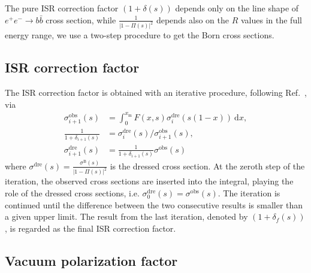\documentclass[aps,showpacs,superscriptaddress,preprint,tightenlines]{revtex4}
\newcommand{\EE}{e^+e^-}
\newcommand{\bbb}{b\bar{b}}
\newcommand{\rhos}{(1+\delta(s))}
\begin{document}
The pure ISR correction factor $\rhos$ depends only on the line
shape of $\EE\to \bbb$ cross section, while $\frac{1}{|1-\Pi(s)|^{2}}$
depends also on the $R$ values in the full energy range, we use a
two-step procedure to get the Born cross sections.

\subsection{ISR correction factor}

The ISR correction factor is obtained with an iterative procedure, 
following Ref.~\cite{Dong:2017tpt}, via
\begin{align}
  \sigma^{\mathrm{obs}}_{i+1}(s)&=\int_0^{x_{\mathrm{m}}}F(x,s)\sigma^{\mathrm{dre}}_i(s(1-x))\  \mathrm{d}x,\label{isr-factor}\\
  \frac1{1+\delta_{i+1}(s)}&=\sigma^{\mathrm{dre}}_i(s)/\sigma^{\mathrm{obs}}_{i+1}(s),\label{isr-factor2}\\
 \sigma^{\mathrm{dre}}_{i+1}(s)& =
 \frac1{1+\delta_{i+1}(s)} \sigma^{\mathrm{obs}}(s)\label{isr-factorf}
\end{align}
where $\sigma^{\mathrm{dre}}(s)=\frac{\sigma^{\mathrm{B}}(s)}{|1-\Pi(s)|^2}$ is 
the dressed cross section. At the zeroth step of the iteration, the observed 
cross sections are inserted into the integral, playing the role of the dressed 
cross sections, i.e. $\sigma^{\mathrm{dre}}_0(s)=\sigma^{\mathrm{obs}}(s)$. 
The iteration is continued until the
difference between the two consecutive results is smaller than a
given upper limit. The result from the last iteration, denoted by
$(1+\delta_f(s))$, is regarded as the final ISR correction factor.

\subsection{Vacuum polarization factor}
\end{document}
